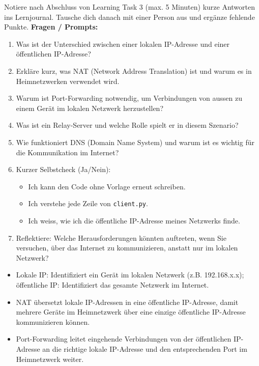\begin{myexercise}
Notiere nach Abschluss von Learning Task 3 (max. 5 Minuten) kurze Antworten ins Lernjournal. Tausche dich danach mit einer Person aus und ergänze fehlende Punkte.
\textbf{Fragen / Prompts:}
\begin{enumerate}
    \item Was ist der Unterschied zwischen einer lokalen IP-Adresse und einer öffentlichen IP-Adresse?
    \item Erkläre kurz, was NAT (Network Address Translation) ist und warum es in Heimnetzwerken verwendet wird.
    \item Warum ist Port-Forwarding notwendig, um Verbindungen von aussen zu einem Gerät im lokalen Netzwerk herzustellen?
    \item Was ist ein Relay-Server und welche Rolle spielt er in diesem Szenario?
    \item Wie funktioniert DNS (Domain Name System) und warum ist es wichtig für die Kommunikation im Internet?
    \item Kurzer Selbstcheck (Ja/Nein): 
        \begin{itemize}
            \item Ich kann den Code ohne Vorlage erneut schreiben.
            \item Ich verstehe jede Zeile von \texttt{client.py}.
            \item Ich weiss, wie ich die öffentliche IP-Adresse meines Netzwerks finde.
        \end{itemize}
    \item Reflektiere: Welche Herausforderungen könnten auftreten, wenn Sie versuchen, über das Internet zu kommunizieren, anstatt nur im lokalen Netzwerk?
\end{enumerate}
\begin{myanswer}
\begin{itemize}
    \item Lokale IP: Identifiziert ein Gerät im lokalen Netzwerk (z.B.      192.168.x.x); öffentliche IP: Identifiziert das gesamte Netzwerk im Internet.
    \item NAT übersetzt lokale IP-Adressen in eine öffentliche IP-Adresse, damit mehrere Geräte im Heimnetzwerk über eine einzige öffentliche IP-Adresse kommunizieren können.
    \item Port-Forwarding leitet eingehende Verbindungen von der öffentlichen IP-Adresse an die richtige lokale IP-Adresse und den entsprechenden Port im Heimnetzwerk weiter.

\end{itemize}
\end{myanswer}
\end{myexercise}
